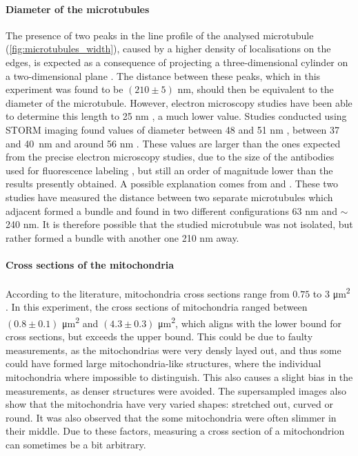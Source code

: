 \paragraph{Diameter of the microtubules}
The presence of two peaks in the line profile of the analysed microtubule (\autoref{fig:microtubules_width}), caused by a higher density of localisations on the edges, is expected as a consequence of projecting a three-dimensional cylinder on a two-dimensional plane \cite{douglass_notice_2023}.
The distance between these peaks, which in this experiment was found to be $(210 \pm 5)$ nm, should then be equivalent to the diameter of the microtubule.
However, electron microscopy studies have been able to determine this length to 25 nm \cite{moores_electron_2008}, a much lower value.
Studies conducted using STORM imaging found values of diameter between 48 and 51 nm \cite{bharadwaj_advancing_2024}, between 37 and \mbox{40 nm} \cite{douglass_super-resolution_2016} and around 56 nm \cite{bates_multicolor_2007}.
These values are larger than the ones expected from the precise electron microscopy studies, due to the size of the antibodies used for fluorescence labeling \cite{douglass_notice_2023}, but still an order of magnitude lower than the results presently obtained.
A possible explanation comes from \cite{dong_stochastic_2015} and \cite{wang_blind_2017}.
These two studies have measured the distance between two separate microtubules which adjacent formed a bundle and found in two different configurations 63 nm and $\sim$240 nm.
It is therefore possible that the studied microtubule  was not isolated, but rather formed a bundle with another one 210 nm away.

\paragraph{Cross sections of the mitochondria}
According to the literature, mitochondria cross sections range from $0.75$ to $3$ \si{\micro\meter\squared} \cite{wiemerslage_quantification_2016}. In this experiment, the cross sections of mitochondria ranged between $(0.8 \pm 0.1)$ \unit{\micro\meter\squared} and $(4.3 \pm 0.3)$ \unit{\micro\meter\squared}, which aligns with the lower bound for cross sections, but exceeds the upper bound. This could be due to faulty measurements, as the mitochondrias were very densly layed out, and thus some could have formed large mitochondria-like structures, where the individual mitochondria where impossible to distinguish. This also causes a slight bias in the measurements, as denser structures were avoided. The supersampled images also show that the mitochondria have very varied shapes: stretched out, curved or round. It was also observed that the some mitochondria were often slimmer in their middle. Due to these factors, measuring a cross section of a mitochondrion can sometimes be a bit arbitrary.

